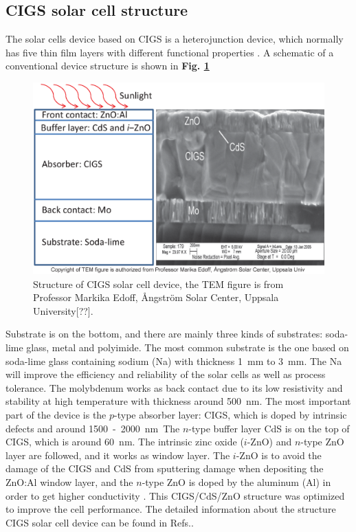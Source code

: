\documentclass[a4paper, 12pt, titlepage,oneside,drop]{kthesis}
\begin{document}
\subsection{CIGS solar cell structure}

The solar cells device based on CIGS is a heterojunction device, which normally has five thin film layers with different functional properties \cite{lundberg2005effect, lundberg2003diffusion, ramanathan2003properties}.
A schematic of a conventional device structure is shown in  \textbf{Fig. \ref{device}}

\begin{figure}[H]
\centering
\includegraphics[scale=0.5]{devicestruc.eps} 
\caption{{\color{red}Structure of CIGS solar cell device, the TEM figure is from Professor Markika Edoff, Ångström Solar Center, Uppsala University[??].}}
\label{device}
\end{figure}

Substrate is on the bottom, and there are mainly three kinds of substrates: soda-lime glass, metal and polyimide. The most common substrate is the one based on soda-lime glass containing sodium (Na) with thickness 
\SI{1} {\mm} to \SI{3} {\mm}. The Na will improve the efficiency and reliability of the solar cells as well as process tolerance. The molybdenum works as back contact due to its low resistivity and stability at high 
temperature with thickness around \SI{500} {\nm}. The most important part of the device is the $p$-type absorber layer: CIGS, which is doped by intrinsic defects and around \SI{1500} - \SI{2000} {\nm}. 
The $n$-type buffer layer CdS is on the top of CIGS, which is around \SI{60} {\nm}. The intrinsic zinc oxide ($i$-ZnO) and $n$-type ZnO layer are followed, and it works as window layer. The $i$-ZnO is to 
avoid the damage of the CIGS and CdS from sputtering damage when depositing the ZnO:Al window layer, and the $n$-type ZnO is doped by the aluminum (Al) in order to get higher conductivity \cite{kim1997structural, minami1984highly}. 
This CIGS/CdS/ZnO structure was optimized to improve the cell performance. The detailed information about the structure CIGS solar cell device can be found in Refs.\cite{naghavi2010buffer,niki2010cigs, kessler2001baseline}.
\end{document}
